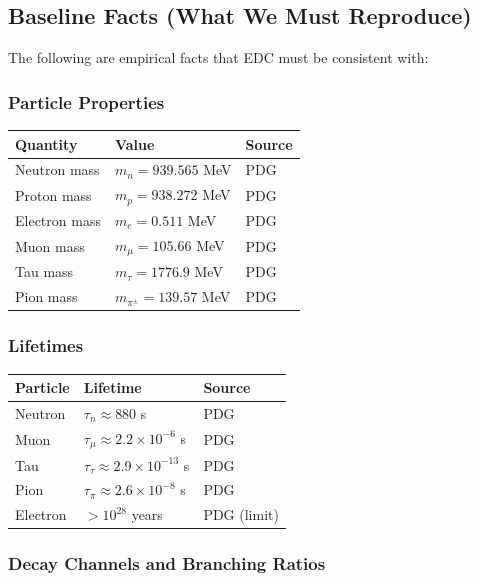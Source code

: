 \subsection{Baseline Facts (What We Must Reproduce)}

The following are empirical facts that EDC must be consistent with:

\subsubsection{Particle Properties}

\begin{center}
\begin{tabular}{lll}
\toprule
\textbf{Quantity} & \textbf{Value} & \textbf{Source} \\
\midrule
Neutron mass & $m_n = 939.565$ MeV & PDG \\
Proton mass & $m_p = 938.272$ MeV & PDG \\
Electron mass & $m_e = 0.511$ MeV & PDG \\
Muon mass & $m_\mu = 105.66$ MeV & PDG \\
Tau mass & $m_\tau = 1776.9$ MeV & PDG \\
Pion mass & $m_{\pi^\pm} = 139.57$ MeV & PDG \\
\bottomrule
\end{tabular}
\end{center}

\subsubsection{Lifetimes}

\begin{center}
\begin{tabular}{lll}
\toprule
\textbf{Particle} & \textbf{Lifetime} & \textbf{Source} \\
\midrule
Neutron & $\tau_n \approx 880$ s & PDG \\
Muon & $\tau_\mu \approx 2.2 \times 10^{-6}$ s & PDG \\
Tau & $\tau_\tau \approx 2.9 \times 10^{-13}$ s & PDG \\
Pion & $\tau_\pi \approx 2.6 \times 10^{-8}$ s & PDG \\
Electron & $> 10^{28}$ years & PDG (limit) \\
\bottomrule
\end{tabular}
\end{center}

\subsubsection{Decay Channels and Branching Ratios}


